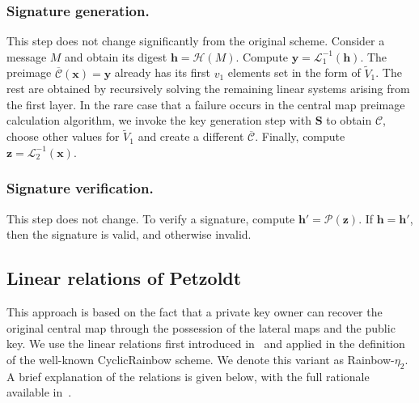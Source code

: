 \documentclass[english]{ufsc-thesis-rn46-2019/ufsc-thesis-rn46-2019}
\theoremstyle{definition}
\begin{document}
\subsubsection{Signature generation.}

This step does not change significantly from the original scheme. Consider
a message $M$ and obtain its digest $\mathbf{h} = \mathcal{H}(M)$. Compute
$\mathbf{y} = \mathcal{L}_{1}^{-1}(\mathbf{h})$. The preimage
$\overline{\mathcal{C}}(\mathbf{x}) = \mathbf{y}$ already has its first
$v_{1}$ elements set in the form of $\widetilde{V}_{1}$. The rest are obtained
by recursively solving the remaining linear systems arising from the first
layer. In the rare case that a failure occurs in the central map preimage
calculation algorithm, we invoke the key generation step with $\mathbf{S}$ to
obtain $\mathcal{C}$, choose other values for $\widetilde{V}_{1}$ and create
a different $\overline{\mathcal{C}}$. Finally, compute
$\mathbf{z} = \mathcal{L}_{2}^{-1}(\mathbf{x})$.

\subsubsection{Signature verification.}

This step does not change. To verify a signature, compute
$\mathbf{h'} = \mathcal{P}(\mathbf{z})$. If $\mathbf{h} = \mathbf{h'}$, then
the signature is valid, and otherwise invalid.

\subsection{Linear relations of Petzoldt}\label{subsec:linear}

This approach is based on the fact that a private key owner can recover the
original central map through the possession of the lateral maps and the public
key. We use the linear relations first introduced in~\cite{Petzoldt:201006} and
applied in the definition of the well-known CyclicRainbow scheme. We denote
this variant as Rainbow-$\eta_{2}$. A brief explanation of the relations is
given below, with the full rationale available
in~\cite[Chap.~7]{Petzoldt:201307}.
\end{document}
